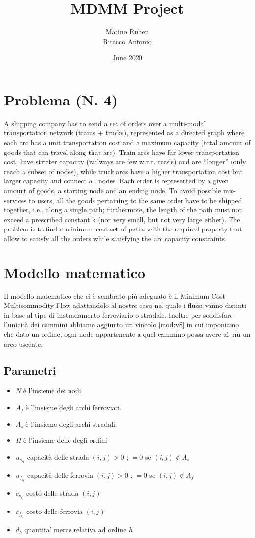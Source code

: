 \documentclass{article}
\title{MDMM Project}
\author{Matino Ruben \\ Ritacco Antonio }
\date{June 2020}
\begin{document}
\maketitle

\section{Problema (N. 4)}

A shipping company has to send a set of orders over a multi-modal transportation network (trains +
trucks), represented as a directed graph where each arc has a unit transportation cost and a
maximum capacity (total amount of goods that can travel along that arc). Train arcs have far lower
transportation cost, have stricter capacity (railways are few w.r.t. roads) and are “longer” (only
reach a subset of nodes), while truck arcs have a higher transportation cost but larger capacity and
connect all nodes. Each order is represented by a given amount of goods, a starting node and an
ending node. To avoid possible mis-services to users, all the goods pertaining to the same order
have to be shipped together, i.e., along a single path; furthermore, the length of the path must not
exceed a prescribed constant k (nor very small, but not very large either). The problem is to find a
minimum-cost set of paths with the required property that allow to satisfy all the orders while
satisfying the arc capacity constraints.


\section{Modello matematico}
Il modello matematico che ci è sembrato più adeguato è il Minimum Cost Multicommodity Flow adattandolo al nostro caso nel quale i flussi vanno distinti in base al tipo di instradamento ferroviario o stradale. Inoltre per soddisfare l'unicità dei cammini abbiamo aggiunto un vincolo \eqref{mod:v8} in cui imponiamo che dato un ordine, ogni nodo appartenente a quel cammino possa avere al più un arco uscente.
\subsection{Parametri}
\begin{itemize}
    \item \textbf{$N$} è l'insieme dei nodi.
    \item \textbf{$A_f$} è l'insieme degli archi ferroviari.
    \item \textbf{$A_s$} è l'insieme degli archi stradali.
    \item \textbf{$H$} è l'insieme delle degli ordini
    \item $u_{s_{ij}}$ capacità delle strada $(i,j) > 0$ ; $=0$ se $(i,j) \not\in A_s $ 
    \item $u_{f_{ij}}$ capacità delle ferrovia $(i,j) > 0$ ; $=0$ se $(i,j) \not\in A_f $ 
    \item $c_{s_{ij}}$ costo delle strada $(i,j)$
    \item $c_{f_{ij}}$ costo delle ferrovia $(i,j)$
    \item $d_h$ quantita' merce relativa ad ordine $h$
\end{itemize}
\end{document}

